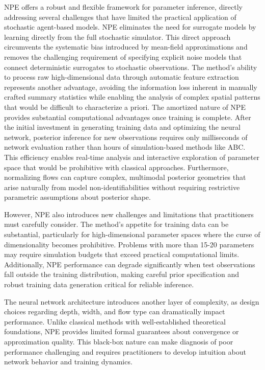 \documentclass{article}
\begin{document}
NPE offers a robust and flexible framework for parameter inference, directly addressing several challenges that have limited the practical application of stochastic agent-based models. NPE eliminates the need for surrogate models by learning directly from the full stochastic simulator. This direct approach circumvents the systematic bias introduced by mean-field approximations and removes the challenging requirement of specifying explicit noise models that connect deterministic surrogates to stochastic observations. The method's ability to process raw high-dimensional data through automatic feature extraction represents another advantage, avoiding the information loss inherent in manually crafted summary statistics while enabling the analysis of complex spatial patterns that would be difficult to characterize a priori. The amortized nature of NPE provides substantial computational advantages once training is complete. After the initial investment in generating training data and optimizing the neural network, posterior inference for new observations requires only milliseconds of network evaluation rather than hours of simulation-based methods like ABC. This efficiency enables real-time analysis and interactive exploration of parameter space that would be prohibitive with classical approaches. Furthermore, normalizing flows can capture complex, multimodal posterior geometries that arise naturally from model non-identifiabilities without requiring restrictive parametric assumptions about posterior shape.

However, NPE also introduces new challenges and limitations that practitioners must carefully consider. The method's appetite for training data can be substantial, particularly for high-dimensional parameter spaces where the curse of dimensionality becomes prohibitive. Problems with more than 15-20 parameters may require simulation budgets that exceed practical computational limits. Additionally, NPE performance can degrade significantly when test observations fall outside the training distribution, making careful prior specification and robust training data generation critical for reliable inference.

The neural network architecture introduces another layer of complexity, as design choices regarding depth, width, and flow type can dramatically impact performance. Unlike classical methods with well-established theoretical foundations, NPE provides limited formal guarantees about convergence or approximation quality. This black-box nature can make diagnosis of poor performance challenging and requires practitioners to develop intuition about network behavior and training dynamics.
\end{document}
